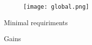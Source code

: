 \begin{frame}{}
   
    \begin{center}
        \begin{figure}
            \texttt{[image: global.png]}               
           
        \end{figure}
    
        \end{center}
\end{frame}

\begin{frame}{Minimal requiriments}
   
\end{frame}

\begin{frame}{Gains}
   
\end{frame}






    
   

